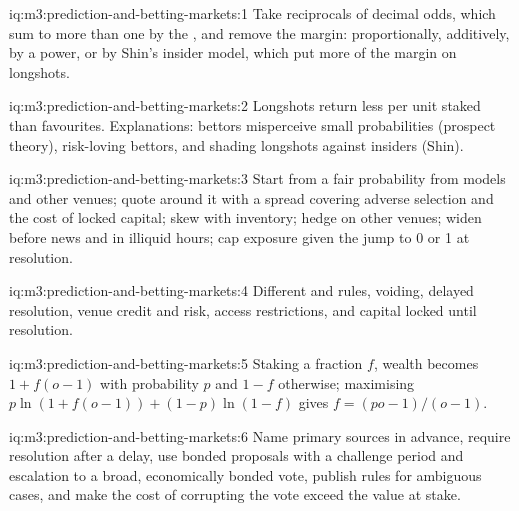 \begin{solution}{iq:m3:prediction-and-betting-markets:1}
Take reciprocals of decimal odds, which sum to more than one by the , and remove the margin: proportionally, additively, by a power, or by Shin's
insider model, which put more of the margin on longshots.
\end{solution}

\begin{solution}{iq:m3:prediction-and-betting-markets:2}
Longshots return less per unit staked than favourites. Explanations: bettors misperceive small probabilities (prospect theory), risk-loving bettors, and
 shading longshots against insiders (Shin).
\end{solution}

\begin{solution}{iq:m3:prediction-and-betting-markets:3}
Start from a fair probability from models and other venues; quote around it with a spread covering adverse selection and the cost of locked capital; skew
with inventory; hedge on other venues; widen before news and in illiquid hours; cap exposure given the jump to 0 or 1 at resolution.
\end{solution}

\begin{solution}{iq:m3:prediction-and-betting-markets:4}
Different  and rules, voiding, delayed resolution, venue credit and  risk, access restrictions, and capital locked until
resolution.
\end{solution}

\begin{solution}{iq:m3:prediction-and-betting-markets:5}
Staking a fraction $f$, wealth becomes $1 + f(o - 1)$ with probability $p$ and $1 - f$ otherwise; maximising $p\ln(1 + f(o - 1)) + (1 - p)\ln(1 - f)$ gives
$f = (po - 1)/(o - 1)$.
\end{solution}

\begin{solution}{iq:m3:prediction-and-betting-markets:6}
Name primary sources in advance, require resolution after a delay, use bonded proposals with a challenge period and escalation to a broad, economically
bonded vote, publish rules for ambiguous cases, and make the cost of corrupting the vote exceed the value at stake.
\end{solution}
